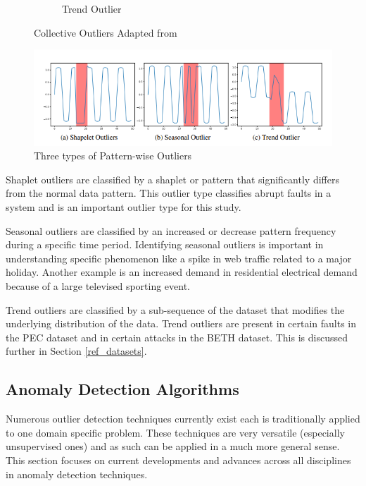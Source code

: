 \begin{figure}[H]
\begin{subfigure}[b]{0.3\textwidth}
         \caption{Trend Outlier}
         \label{fig:trend}
     \end{subfigure}
        \caption{Collective Outliers Adapted from \cite{lai2021revisiting}}
        \label{fig:contextual-outliers}
\end{figure}

\begin{figure}[H]
    \includegraphics[width=\textwidth]{Images/contextual_outliers_graphic.PNG}
    \caption{Three types of Pattern-wise Outliers  \parencite{lai2021revisiting}}
    \label{fig:contextual-outliers}
\end{figure}
Shaplet outliers are classified by a shaplet or pattern that significantly differs from the normal data pattern. This outlier type classifies abrupt faults in a system and is an important outlier type for this study.

Seasonal outliers are classified by an increased or decrease pattern frequency during a specific time period. Identifying seasonal outliers is important in understanding specific phenomenon like a spike in web traffic related to a major holiday. Another example is an increased demand in residential electrical demand because of a large televised sporting event.

Trend outliers are classified by a sub-sequence of the dataset that modifies the underlying distribution of the data. Trend outliers are present in certain faults in the PEC dataset and in certain attacks in the BETH dataset. This is discussed further in Section \ref{ref_datasets}.

\subsection{Anomaly Detection Algorithms}
\label{ref_anomaly_detection_alg}

Numerous outlier detection techniques currently exist each is traditionally applied to one domain specific problem. These techniques are very versatile (especially unsupervised ones) and as such can be applied in a much more general sense. This section focuses on current developments and advances across all disciplines in anomaly detection techniques.

